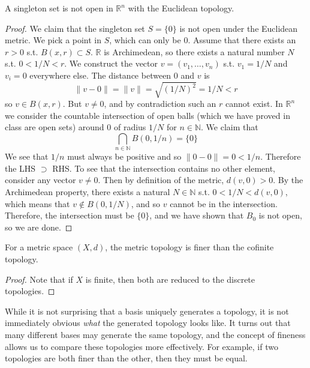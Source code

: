   \begin{lemma}
    A singleton set is not open in $\mathbb{R}^n$ with the Euclidean topology.   
  \end{lemma}
  \begin{proof}
    We claim that the singleton set $S = \{0\}$ is not open under the Euclidean metric. We pick a point in $S$, which can only be $0$. Assume that there exists an $r > 0$ s.t. $B(x, r) \subset S$. $\mathbb{R}$ is Archimedean, so there exists a natural number $N$ s.t. $0 < 1/N < r$. We construct the vector $v = (v_1, \ldots, v_n)$ s.t. $v_1 = 1/N$ and $v_i = 0$ everywhere else. The distance between $0$ and $v$ is 
    \begin{equation}
      \| v - 0 \| = \|v\| = \sqrt{(1/N)^2} = 1/N < r
    \end{equation} 
    so $v \in B(x, r)$. But $v \neq 0$, and by contradiction such an $r$ cannot exist. In $\mathbb{R}^n$ we consider the countable intersection of open balls (which we have proved in class are open sets) around $0$ of radius $1/N$ for $n \in \mathbb{N}$. We claim that 
    \begin{equation}
      \bigcap_{n \in \mathbb{N}} B(0, 1/n) = \{0\}
    \end{equation} 
    We see that $1/n$ must always be positive and so $\|0 - 0\| = 0 < 1/n$. Therefore the LHS $\supset $ RHS. To see that the intersection contains no other element, consider any vector $v \neq 0$. Then by definition of the metric, $d(v, 0) > 0$. By the Archimedean property, there exists a natural $N \in \mathbb{N}$ s.t. $0 < 1/N < d(v, 0)$, which means that $v \not\in B(0, 1/N)$, and so $v$ cannot be in the intersection. Therefore, the intersection must be $\{0\}$, and we have shown that $B_0$ is not open, so we are done. 
  \end{proof}

  \begin{theorem}
    For a metric space $(X, d)$, the metric topology is finer than the cofinite topology. 
  \end{theorem} 
  \begin{proof}
    Note that if $X$ is finite, then both are reduced to the discrete topologies. 
  \end{proof}

  While it is not surprising that a basis uniquely generates a topology, it is not immediately obvious \textit{what} the generated topology looks like. It turns out that many different bases may generate the same topology, and the concept of fineness allows us to compare these topologies more effectively. For example, if two topologies are both finer than the other, then they must be equal. 

